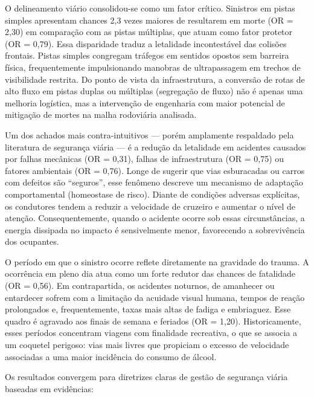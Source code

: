 \documentclass[
  brazilian,
  12pt,
]{article}
\begin{document}
O delineamento viário consolidou-se como um fator crítico. Sinistros em
pistas simples apresentam chances 2,3 vezes maiores de resultarem em
morte (OR = 2,30) em comparação com as pistas múltiplas, que atuam como
fator protetor (OR = 0,79). Essa disparidade traduz a letalidade
incontestável das colisões frontais. Pistas simples congregam tráfegos
em sentidos opostos sem barreira física, frequentemente impulsionando
manobras de ultrapassagem em trechos de visibilidade restrita. Do ponto
de vista da infraestrutura, a conversão de rotas de alto fluxo em pistas
duplas ou múltiplas (segregação de fluxo) não é apenas uma melhoria
logística, mas a intervenção de engenharia com maior potencial de
mitigação de mortes na malha rodoviária analisada.

Um dos achados mais contra-intuitivos --- porém amplamente respaldado
pela literatura de segurança viária --- é a redução da letalidade em
acidentes causados por falhas mecânicas (OR = 0,31), falhas de
infraestrutura (OR = 0,75) ou fatores ambientais (OR = 0,76). Longe de
sugerir que vias esburacadas ou carros com defeitos são ``seguros'',
esse fenômeno descreve um mecanismo de adaptação comportamental
(homeostase de risco). Diante de condições adversas explícitas, os
condutores tendem a reduzir a velocidade de cruzeiro e aumentar o nível
de atenção. Consequentemente, quando o acidente ocorre sob essas
circunstâncias, a energia dissipada no impacto é sensivelmente menor,
favorecendo a sobrevivência dos ocupantes.

O período em que o sinistro ocorre reflete diretamente na gravidade do
trauma. A ocorrência em pleno dia atua como um forte redutor das chances
de fatalidade (OR = 0,56). Em contrapartida, os acidentes noturnos, de
amanhecer ou entardecer sofrem com a limitação da acuidade visual
humana, tempos de reação prolongados e, frequentemente, taxas mais altas
de fadiga e embriaguez. Esse quadro é agravado aos finais de semana e
feriados (OR = 1,20). Historicamente, esses períodos concentram viagens
com finalidade recreativa, o que se associa a um coquetel perigoso: vias
mais livres que propiciam o excesso de velocidade associadas a uma maior
incidência do consumo de álcool.

Os resultados convergem para diretrizes claras de gestão de segurança
viária baseadas em evidências:
\end{document}
